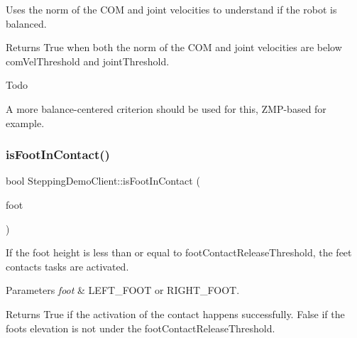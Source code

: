 Uses the norm of the C\+OM and joint velocities to understand if the robot is balanced.

\begin{DoxyReturn}{Returns}
True when both the norm of the C\+OM and joint velocities are below com\+Vel\+Threshold and joint\+Threshold. 
\end{DoxyReturn}
\begin{DoxyRefDesc}{Todo}
\item[\hyperlink{todo__todo000002}{Todo}]A more balance-\/centered criterion should be used for this, Z\+M\+P-\/based for example. \end{DoxyRefDesc}
\hypertarget{classSteppingDemoClient_aeeaa9fac47e3e5a141647b07fa2feaa3}{}\label{classSteppingDemoClient_aeeaa9fac47e3e5a141647b07fa2feaa3} 
\subsubsection{\texorpdfstring{is\+Foot\+In\+Contact()}{isFootInContact()}}
{\footnotesize\ttfamily bool Stepping\+Demo\+Client\+::is\+Foot\+In\+Contact (\begin{DoxyParamCaption}\item[{\hyperlink{SteppingDemoClient_8h_ab0673d7f17cdd57b8fa124abb330287f}{F\+O\+O\+T\+\_\+\+C\+O\+N\+T\+A\+C\+TS}}]{foot }\end{DoxyParamCaption})\hspace{0.3cm}{\ttfamily [private]}}

If the foot height is less than or equal to foot\+Contact\+Release\+Threshold, the feet contacts tasks are activated.


\begin{DoxyParams}{Parameters}
{\em foot} & L\+E\+F\+T\+\_\+\+F\+O\+OT or R\+I\+G\+H\+T\+\_\+\+F\+O\+OT.\\
\hline
\end{DoxyParams}
\begin{DoxyReturn}{Returns}
True if the activation of the contact happens successfully. False if the foot\textquotesingle{}s elevation is not under the foot\+Contact\+Release\+Threshold. 
\end{DoxyReturn}
\hypertarget{classSteppingDemoClient_a94b990ae53b1b40ef8f9469b427d171c}{}\label{classSteppingDemoClient_a94b990ae53b1b40ef8f9469b427d171c} 

